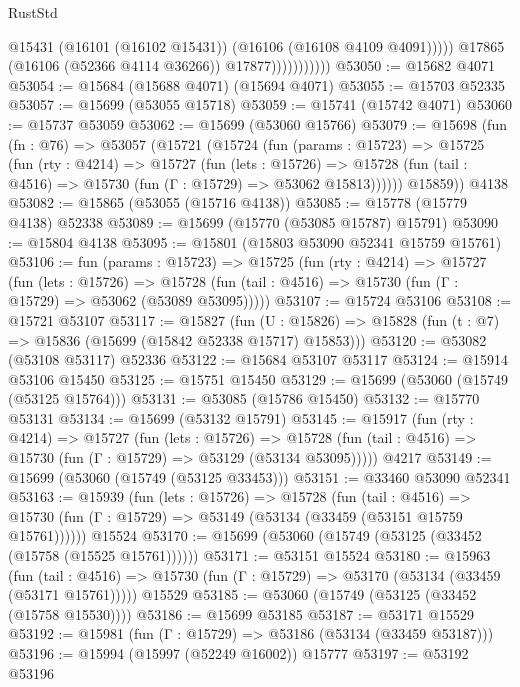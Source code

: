 \begin{lexlean}{RustStd}
\begin{coremodule}
                                @15431
                                (@16101 (@16102 @15431))
                                (@16106 (@16108 @4109 @4091)))))
                          @17865
                          (@16106 (@52366 @4114 @36266))
                          @17877)))))))))))
@53050 := @15682 @4071
@53054 := @15684 (@15688 @4071) (@15694 @4071)
@53055 := @15703 @52335
@53057 := @15699 (@53055 @15718)
@53059 := @15741 (@15742 @4071)
@53060 := @15737 @53059
@53062 := @15699 (@53060 @15766)
@53079 := @15698
    (fun (fn : @76) =>
    @53057
      (@15721
        (@15724
          (fun (params : @15723) =>
          @15725
            (fun (rty : @4214) =>
            @15727
              (fun (lets : @15726) =>
              @15728 (fun (tail : @4516) => @15730 (fun (Γ : @15729) => @53062 @15813))))))
        @15859))
    @4138
@53082 := @15865 (@53055 (@15716 @4138))
@53085 := @15778 (@15779 @4138) @52338
@53089 := @15699 (@15770 (@53085 @15787) @15791)
@53090 := @15804 @4138
@53095 := @15801 (@15803 @53090 @52341 @15759 @15761)
@53106 := fun (params : @15723) =>
  @15725
    (fun (rty : @4214) =>
    @15727
      (fun (lets : @15726) =>
      @15728 (fun (tail : @4516) => @15730 (fun (Γ : @15729) => @53062 (@53089 @53095)))))
@53107 := @15724 @53106
@53108 := @15721 @53107
@53117 := @15827
    (fun (U : @15826) => @15828 (fun (t : @7) => @15836 (@15699 (@15842 @52338 @15717) @15853)))
@53120 := @53082 (@53108 @53117) @52336
@53122 := @15684 @53107 @53117
@53124 := @15914 @53106 @15450
@53125 := @15751 @15450
@53129 := @15699 (@53060 (@15749 (@53125 @15764)))
@53131 := @53085 (@15786 @15450)
@53132 := @15770 @53131
@53134 := @15699 (@53132 @15791)
@53145 := @15917
    (fun (rty : @4214) =>
    @15727
      (fun (lets : @15726) =>
      @15728 (fun (tail : @4516) => @15730 (fun (Γ : @15729) => @53129 (@53134 @53095)))))
    @4217
@53149 := @15699 (@53060 (@15749 (@53125 @33453)))
@53151 := @33460 @53090 @52341
@53163 := @15939
    (fun (lets : @15726) =>
    @15728
      (fun (tail : @4516) =>
      @15730 (fun (Γ : @15729) => @53149 (@53134 (@33459 (@53151 @15759 @15761))))))
    @15524
@53170 := @15699 (@53060 (@15749 (@53125 (@33452 (@15758 (@15525 @15761))))))
@53171 := @53151 @15524
@53180 := @15963
    (fun (tail : @4516) => @15730 (fun (Γ : @15729) => @53170 (@53134 (@33459 (@53171 @15761)))))
    @15529
@53185 := @53060 (@15749 (@53125 (@33452 (@15758 @15530))))
@53186 := @15699 @53185
@53187 := @53171 @15529
@53192 := @15981 (fun (Γ : @15729) => @53186 (@53134 (@33459 @53187)))
@53196 := @15994 (@15997 (@52249 @16002)) @15777
@53197 := @53192 @53196

\end{coremodule}
\end{lexlean}
